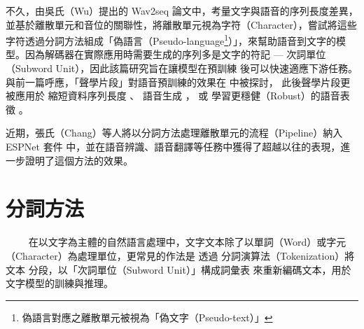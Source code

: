 不久，由吳氏（Wu）提出的 Wav2seq \cite{wu_wav2seq_2023}論文中，考量文字與語音的序列長度差異，並基於離散單元和音位的關聯性，將離散單元視為字符（Character），嘗試將這些字符透過分詞方法組成「偽語言（Pseudo-language\footnote{偽語言對應之離散單元被視為「偽文字（Pseudo-text）」}）」，來幫助語音到文字的模型。因為解碼器在實際應用時需要生成的序列多是文字的符記 --- 次詞單位（Subword Unit），因此該篇研究旨在讓模型在預訓練
後可以快速適應下游任務。
與前一篇呼應，「聲學片段」對語音預訓練的效果在
\cite{10096788}
中被探討，
此後聲學片段更被應用於
縮短資料序列長度\cite{chang_exploration_2023} 
、
語音生成
\cite{shen2024acoustic}，
或
學習更穩健（Robust）的語音表徵
\cite{chang2023r}。


近期，張氏（Chang）等人\cite{chang_exploring_2024}將以分詞方法處理離散單元的流程（Pipeline）納入 ESPNet 套件 \cite{watanabe2018espnet} 中，並在語音辨識、語音翻譯等任務中獲得了超越以往的表現，進一步證明了這個方法的效果。



\section{分詞方法}

　　
在以文字為主體的自然語言處理中，文字文本除了以單詞（Word）或字元（Character）為處理單位，更常見的作法是
透過
分詞演算法（Tokenization）將
文本
分段，以「次詞單位（Subword Unit）」構成詞彙表
來重新編碼文本，用於文字模型的訓練與推理。

